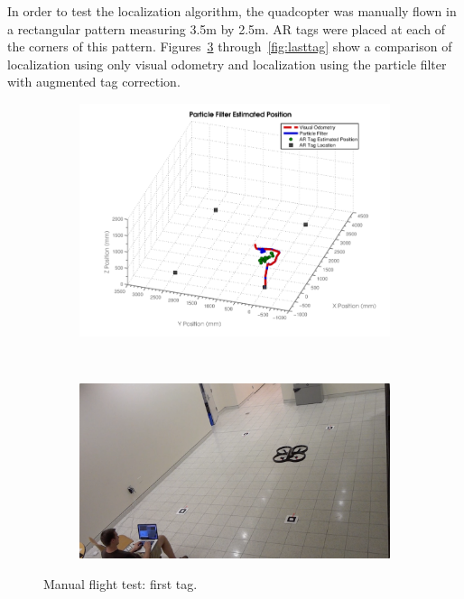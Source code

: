 	In order to test the localization algorithm, the quadcopter was manually flown in a rectangular pattern measuring 3.5m by 2.5m. AR tags were placed at each of the corners of this pattern. Figures~\ref{fig:firsttag} through~\ref{fig:lasttag} show a comparison of localization using only visual odometry and localization using the particle filter with augmented tag correction.
	
	\begin{figure}[ht]
	        \centering
	        \begin{subfigure}[b]{0.9\textwidth}
	                \centering
	                \includegraphics[width=\textwidth]{../images/3dgraph_38.png}
	                \label{fig:tag1}
	        \end{subfigure}%
	        \\
	        \begin{subfigure}[b]{0.75\textwidth}
	                \centering
	                \includegraphics[width=\textwidth]{../images/frame1.png}
	                \label{fig:frame1}
	        \end{subfigure}
	        \caption{Manual flight test: first tag.} \label{fig:firsttag}
	\end{figure}

